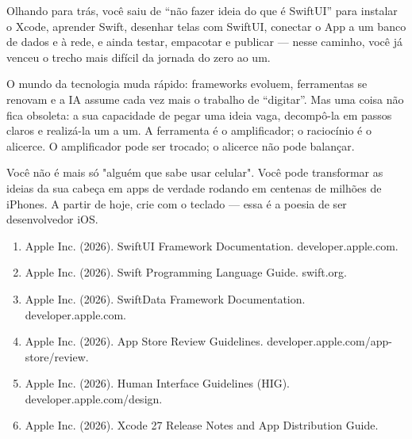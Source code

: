 
Olhando para trás, você saiu de “não fazer ideia do que é SwiftUI” para instalar o Xcode, aprender Swift, desenhar telas com SwiftUI, conectar o App a um banco de dados e à rede, e ainda testar, empacotar e publicar — nesse caminho, você já venceu o trecho mais difícil da jornada do zero ao um.

O mundo da tecnologia muda rápido: frameworks evoluem, ferramentas se renovam e a IA assume cada vez mais o trabalho de “digitar”. Mas uma coisa não fica obsoleta: a sua capacidade de pegar uma ideia vaga, decompô-la em passos claros e realizá-la um a um. A ferramenta é o amplificador; o raciocínio é o alicerce. O amplificador pode ser trocado; o alicerce não pode balançar.

Você não é mais só "alguém que sabe usar celular". Você pode transformar as ideias da sua cabeça em apps de verdade rodando em centenas de milhões de iPhones. A partir de hoje, crie com o teclado — essa é a poesia de ser desenvolvedor iOS.


\begin{enumerate}
  \item Apple Inc. (2026). SwiftUI Framework Documentation. developer.apple.com.
  \item Apple Inc. (2026). Swift Programming Language Guide. swift.org.
  \item Apple Inc. (2026). SwiftData Framework Documentation. developer.apple.com.
  \item Apple Inc. (2026). App Store Review Guidelines. developer.apple.com/app-store/review.
  \item Apple Inc. (2026). Human Interface Guidelines (HIG). developer.apple.com/design.
  \item Apple Inc. (2026). Xcode 27 Release Notes and App Distribution Guide.
\end{enumerate}

